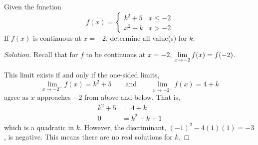 \question Given the function \begin{equation*}
  f(x) = \begin{cases}
    k^2+5 & x \leq -2 \\
    x^2+k & x > -2
  \end{cases}
\end{equation*}
If $f(x)$ is continuous at $x=-2$, determine all value(s) for $k$. %
\begin{proof}[Solution]
  Recall that for $f$ to be continuous at $x=-2$, $\displaystyle\lim_{x\to-2}f(x)=f(-2)$.

  This limit exists if and only if the one-sided limits,
  \[ \lim_{x\to-2^-}f(x) = k^2+5 \qquad \text{and} \qquad \lim_{x\to-2^+}f(x) = 4+k \]
  agree as $x$ approaches $-2$ from above and below. That is,
  \begin{align*}
    k^2 + 5 & = 4 + k       \\
    0       & = k^2 - k + 1
  \end{align*}
  which is a quadratic in $k$.
  However, the discriminant, $(-1)^2-4(1)(1)=-3$, is negative.
  This means there are no real solutions for $k$.
\end{proof}

